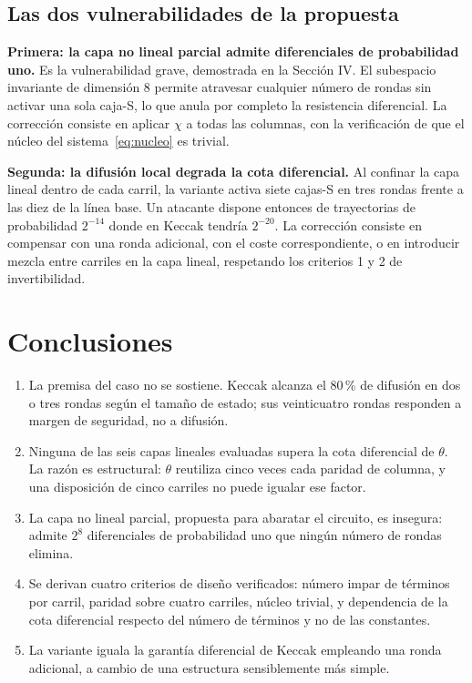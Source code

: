 \documentclass[conference]{IEEEtran}
\begin{document}
\subsection{Las dos vulnerabilidades de la propuesta}

\textbf{Primera: la capa no lineal parcial admite diferenciales de probabilidad
uno.} Es la vulnerabilidad grave, demostrada en la Sección IV. El subespacio
invariante de dimensión $8$ permite atravesar cualquier número de rondas sin
activar una sola caja-S, lo que anula por completo la resistencia diferencial. La
corrección consiste en aplicar $\chi$ a todas las columnas, con la verificación de
que el núcleo del sistema~\eqref{eq:nucleo} es trivial.

\textbf{Segunda: la difusión local degrada la cota diferencial.} Al confinar la
capa lineal dentro de cada carril, la variante activa siete cajas-S en tres rondas
frente a las diez de la línea base. Un atacante dispone entonces de trayectorias
de probabilidad $2^{-14}$ donde en Keccak tendría $2^{-20}$. La corrección
consiste en compensar con una ronda adicional, con el coste correspondiente, o en
introducir mezcla entre carriles en la capa lineal, respetando los criterios 1
y 2 de invertibilidad.

\section{Conclusiones}

\begin{enumerate}
\item La premisa del caso no se sostiene. Keccak alcanza el 80\,\% de difusión en
dos o tres rondas según el tamaño de estado; sus veinticuatro rondas responden a
margen de seguridad, no a difusión.
\item Ninguna de las seis capas lineales evaluadas supera la cota diferencial de
$\theta$. La razón es estructural: $\theta$ reutiliza cinco veces cada paridad de
columna, y una disposición de cinco carriles no puede igualar ese factor.
\item La capa no lineal parcial, propuesta para abaratar el circuito, es
insegura: admite $2^{8}$ diferenciales de probabilidad uno que ningún número de
rondas elimina.
\item Se derivan cuatro criterios de diseño verificados: número impar de términos
por carril, paridad sobre cuatro carriles, núcleo trivial, y dependencia de la
cota diferencial respecto del número de términos y no de las constantes.
\item La variante iguala la garantía diferencial de Keccak empleando una ronda
adicional, a cambio de una estructura sensiblemente más simple.
\end{enumerate}
\end{document}

